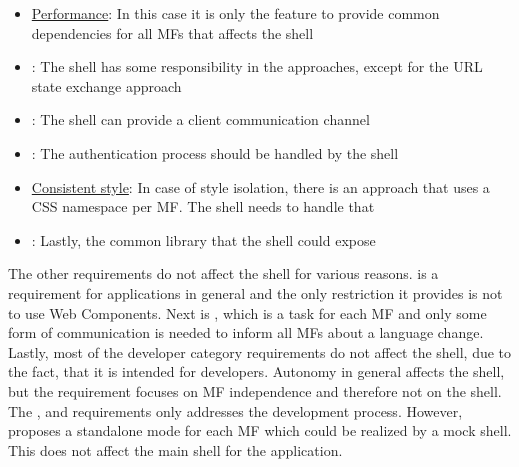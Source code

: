 \begin{itemize}
      \item \hyperref[cha:requirement_detail_performance]{Performance}:
            In this case it is only the feature to provide common dependencies for all \acp{MF} that affects the shell

      \item \textit{}:
            The shell has some responsibility in the approaches, except for the \ac{URL} state exchange approach

      \item \textit{}:
            The shell can provide a client communication channel

      \item \textit{}:
            The authentication process should be handled by the shell

      \item \hyperref[cha:requirement_detail_style]{Consistent style}:
            In case of style isolation, there is an approach that uses a \ac{CSS} namespace per \ac{MF}. The shell needs to handle that

      \item \textit{}:
            Lastly, the common library that the shell could expose
\end{itemize}

The other requirements do not affect the shell for various reasons.
 is a requirement for applications in general and the only restriction it provides is not to use Web Components.
Next is \textit{}, which is a task for each \ac{MF} and only some form of communication is needed to inform all \acp{MF} about a language change.
Lastly, most of the developer category requirements do not affect the shell, due to the fact, that it is intended for developers.
Autonomy in general affects the shell, but the \textit{} requirement focuses on \ac{MF} independence and therefore not on the shell.
The \textit{}, \textit{} and \textit{} requirements only addresses the development process.
However, \textit{} proposes a standalone mode for each \ac{MF} which could be realized by a mock shell.
This does not affect the main shell for the application.





